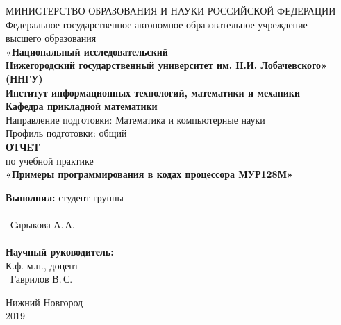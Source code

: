 \documentclass[12pt,a4paper,oneside]{report}
\date{}
\begin{document}
	
	\begin{titlepage}	
		{\fontsize{14pt}{13pt}\selectfont
			\begin{center}
				МИНИСТЕРСТВО ОБРАЗОВАНИЯ И НАУКИ РОССИЙСКОЙ ФЕДЕРАЦИИ\\
				Федеральное государственное автономное образовательное учреждение\\
				высшего образования\\
				\textbf{«Национальный исследовательский\\Нижегородский государственный университет им. Н.И. Лобачевского»\\(ННГУ)\\
					\vspace{1cm}
					Институт информационных технологий, математики и механики\\
					\vspace{0.6cm}
					Кафедра прикладной математики\\}
				\vspace{0.8cm}
				Направление подготовки: Математика и компьютерные науки\\
				Профиль подготовки: общий\\
				\vspace{1cm}
				{\fontsize{18pt}{18pt}\selectfont \textbf{ОТЧЕТ\\}}
				по учебной практике\\
				\vspace{0.7cm}
				{\fontsize{16pt}{16pt}\selectfont \textbf{«Примеры программирования в кодах процессора МУР128М»}}
			\end{center}
			
			\vspace{2.5cm}
			
			\hfill\begin{minipage}{0.55\textwidth}
				\textbf {Выполнил:} студент группы
				\underline{\hspace{1.5cm}}\\
				\\
				\hspace*{2.7cm}
				\underline{\hspace{2.3cm}} ~Сарыкова А.\,А.\\
				\\
				\textbf {Научный руководитель:}\\К.ф.-м.н., доцент\\
				\hspace*{2.7cm}
				\underline{\hspace{2.3cm}} ~Гаврилов В.\,С.
			\end{minipage}
			
			\vfill
			
			\begin{center}
				Нижний Новгород \\ 
				2019 
			\end{center}
		}
		
\end{titlepage}
\end{document}
